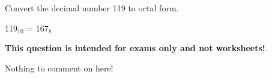 

Convert the decimal number 119 to octal form.







119$_{10}$ = 167$_8$







{\bf This question is intended for exams only and not worksheets!}.

Nothing to comment on here!




